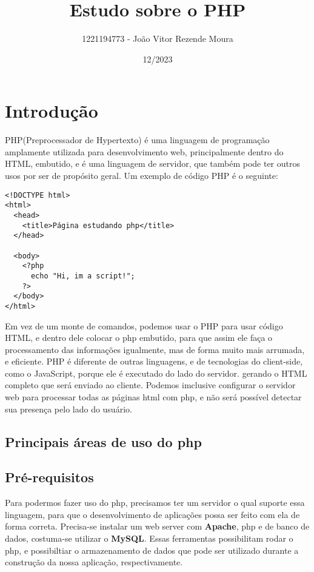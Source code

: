\documentclass[12pt a4paper]{paper}
\title{Estudo sobre o PHP}
\author{1221194773 - João Vitor Rezende Moura}
\date{12/2023}
\begin{document}
\maketitle

\section{Introdução}
PHP(Preprocessador de Hypertexto) é uma linguagem de programação amplamente utilizada para desenvolvimento web, 
principalmente dentro do HTML, embutido, e é uma linguagem de servidor, que também pode ter outros usos por ser de 
propósito geral. Um exemplo de código PHP é o seguinte:

\begin{verbatim}
<!DOCTYPE html>
<html>
  <head>
    <title>Página estudando php</title>  
  </head>

  <body>
    <?php
      echo "Hi, im a script!";
    ?>
  </body>
</html>
\end{verbatim}

Em vez de um monte de comandos, podemos usar o PHP para usar código HTML, e dentro dele colocar o php embutido, para que 
assim ele faça o processamento das informações igualmente, mas de forma muito mais arrumada, e eficiente.
PHP é diferente de outras linguagens, e de tecnologias do client-side, como o JavaScript, porque ele é executado do 
lado do servidor. gerando o HTML completo que será enviado ao cliente. Podemos imclusive configurar o servidor web para 
processar todas as páginas html com php, e não será possível detectar sua presença pelo lado do usuário.


\subsection{Principais áreas de uso do php}

\subsection{Pré-requisitos}
Para podermos fazer uso do php, precisamos ter um servidor o qual suporte essa linguagem, para que o desenvolvimento de 
aplicações possa ser feito com ela de forma correta. Precisa-se instalar um web server com \textbf{Apache}, php e de 
banco de dados, costuma-se utilizar o \textbf{MySQL}. Essas ferramentas possibilitam rodar o php, e possibiltiar o 
armazenamento de dados que pode ser utilizado durante a construção da nossa aplicação, respectivamente.
\end{document}

